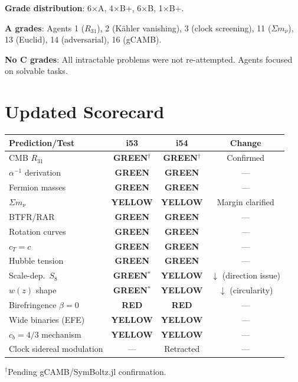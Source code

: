 \documentclass[11pt,a4paper]{article}
\newcommand{\GREEN}{\textcolor{dfdgreen}{\textbf{GREEN}}}
\newcommand{\YELLOW}{\textcolor{dfdyellow}{\textbf{YELLOW}}}
\newcommand{\RED}{\textcolor{dfdred}{\textbf{RED}}}
\begin{document}
\textbf{Grade distribution}: 6$\times$A, 4$\times$B+, 6$\times$B, 1$\times$B+.

\textbf{A grades}: Agents 1 ($R_{31}$), 2 (K\"ahler vanishing), 3 (clock screening), 11 ($\Sigma m_\nu$), 13 (Euclid), 14 (adversarial), 16 (gCAMB).

\textbf{No C grades}: All intractable problems were not re-attempted. Agents focused on solvable tasks.


\section{Updated Scorecard}
\label{sec:scorecard}

\begin{center}
\begin{longtable}{p{5cm}ccc}
\toprule
\textbf{Prediction/Test} & \textbf{i53} & \textbf{i54} & \textbf{Change} \\
\midrule
CMB $R_{31}$ & \GREEN$^\dagger$ & \GREEN$^\dagger$ & Confirmed \\
$\alpha^{-1}$ derivation & \GREEN & \GREEN & --- \\
Fermion masses & \GREEN & \GREEN & --- \\
$\Sigma m_\nu$ & \YELLOW & \YELLOW & Margin clarified \\
BTFR/RAR & \GREEN & \GREEN & --- \\
Rotation curves & \GREEN & \GREEN & --- \\
$c_T = c$ & \GREEN & \GREEN & --- \\
Hubble tension & \GREEN & \GREEN & --- \\
Scale-dep.\ $S_8$ & \GREEN$^*$ & \YELLOW & $\downarrow$ (direction issue) \\
$w(z)$ shape & \GREEN$^*$ & \YELLOW & $\downarrow$ (circularity) \\
Birefringence $\beta = 0$ & \RED & \RED & --- \\
Wide binaries (EFE) & \YELLOW & \YELLOW & --- \\
$c_b = 4/3$ mechanism & \YELLOW & \YELLOW & --- \\
Clock sidereal modulation & --- & Retracted & --- \\
\bottomrule
\end{longtable}
\end{center}

$^\dagger$Pending gCAMB/SymBoltz.jl confirmation.
\end{document}
